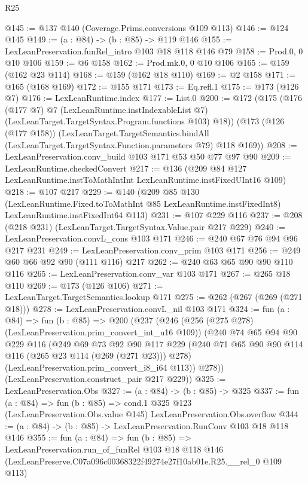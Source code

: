 \begin{lexlean}{R25}
\begin{coremodule}
@145 := @137 @140 (Coverage.Prims.conversions @109 @113)
@146 := @124 @145
@149 := (a : @84) -> (b : @85) -> @119 @146
@155 := LexLeanPreservation.funRel_intro @103 @18 @118 @146 @79
@158 := Prod.{0, 0} @10 @106
@159 := @6 @158
@162 := Prod.mk.{0, 0} @10 @106
@165 := @159 (@162 @23 @114)
@168 := @159 (@162 @18 @110)
@169 := @2 @158
@171 := @165 (@168 @169)
@172 := @155 @171
@173 := Eq.refl.{1}
@175 := @173 (@126 @7)
@176 := LexLeanRuntime.index
@177 := List.{0}
@200 := @172
    (@175
      (@176
        (@177 @7)
        @7
        (LexLeanRuntime.instIndexableList @7)
        (LexLeanTarget.TargetSyntax.Program.functions @103)
        @18))
    (@173
      (@126 (@177 @158))
      (LexLeanTarget.TargetSemantics.bindAll
        (LexLeanTarget.TargetSyntax.Function.parameters @79)
        @118
        @169))
@208 := LexLeanPreservation.conv_build @103 @171 @53 @50 @77 @97 @90
@209 := LexLeanRuntime.checkedConvert
@217 := @136 (@209 @84 @127 LexLeanRuntime.instToMathIntInt LexLeanRuntime.instFixedUInt16 @109)
@218 := @107 @217
@229 := @140
    (@209
      @85
      @130
      (LexLeanRuntime.Fixed.toToMathInt @85 LexLeanRuntime.instFixedInt8)
      LexLeanRuntime.instFixedInt64
      @113)
@231 := @107 @229 @116
@237 := @208 (@218 @231) (LexLeanTarget.TargetSyntax.Value.pair @217 @229)
@240 := LexLeanPreservation.convL_cons @103 @171
@246 := @240 @67 @76 @94 @96 @217 @231
@249 := LexLeanPreservation.conv_prim @103 @171
@256 := @249 @60 @66 @92 @90 (@111 @116) @217
@262 := @240 @63 @65 @90 @90 @110 @116
@265 := LexLeanPreservation.conv_var @103 @171
@267 := @265 @18 @110
@269 := @173 (@126 @106)
@271 := LexLeanTarget.TargetSemantics.lookup @171
@275 := @262 (@267 (@269 (@271 @18)))
@278 := LexLeanPreservation.convL_nil @103 @171
@324 := fun (a : @84) =>
  fun (b : @85) =>
  @200
    (@237
      (@246
        (@256 (@275 @278) (LexLeanPreservation.prim_convert_int_u16 @109))
        (@240
          @74
          @65
          @94
          @90
          @229
          @116
          (@249
            @69
            @73
            @92
            @90
            @117
            @229
            (@240 @71 @65 @90 @90 @114 @116 (@265 @23 @114 (@269 (@271 @23))) @278)
            (LexLeanPreservation.prim_convert_i8_i64 @113))
          @278))
      (LexLeanPreservation.construct_pair @217 @229))
@325 := LexLeanPreservation.Obs
@327 := (a : @84) -> (b : @85) -> @325
@337 := fun (a : @84) =>
  fun (b : @85) =>
  cond.{1} @325 @123 (LexLeanPreservation.Obs.value @145) LexLeanPreservation.Obs.overflow
@344 := (a : @84) -> (b : @85) -> LexLeanPreservation.RunConv @103 @18 @118 @146
@355 := fun (a : @84) =>
  fun (b : @85) =>
  LexLeanPreservation.run_of_funRel
    @103
    @18
    @118
    @146
    (LexLeanPreserve.C07a096c00368322f49274e27f10ab01e.R25.__rel_0 @109 @113)
\end{coremodule}
\end{lexlean}
